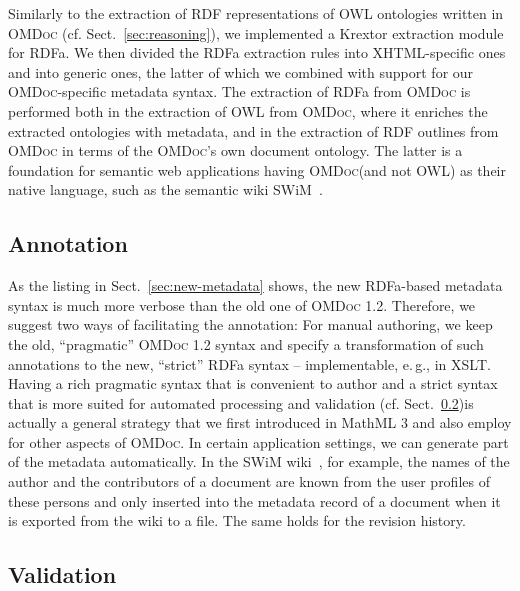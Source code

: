 \documentclass{llncs}
\renewcommand{\omdoc}{\textsc{OMDoc}\xspace}
\begin{document}
Similarly to the extraction of RDF representations of OWL ontologies written in \omdoc
(cf. Sect.~\ref{sec:reasoning}), we implemented a Krextor extraction module for RDFa.
We then divided the RDFa extraction rules into XHTML-specific ones and into generic ones,
the latter of which we combined with support for our \omdoc-specific metadata syntax.  The
extraction of RDFa from \omdoc is performed both in the extraction of OWL from \omdoc,
where it enriches the extracted ontologies with metadata, and in the extraction of RDF
outlines from \omdoc in terms of the \omdoc's own document ontology.  The latter is a
foundation for semantic web applications having \omdoc (and not OWL) as their native
language, such as the semantic wiki SWiM~\cite{lange:swim-demo08}.

\subsection{Annotation}\label{sec:annotation}

As the listing in Sect.~\ref{sec:new-metadata} shows, the new RDFa-based metadata syntax
is much more verbose than the old one of {\omdoc} 1.2.  Therefore, we suggest two ways of
facilitating the annotation: For manual authoring, we keep the old, ``pragmatic'' {\omdoc}
1.2 syntax and specify a transformation of such annotations to the new, ``strict'' RDFa
syntax -- implementable, e.\,g., in XSLT.  Having a rich pragmatic syntax that is
convenient to author and a strict syntax that is more suited for automated processing and
validation \ifpublic\else (cf. Sect.~\ref{sec:validation})\fi is actually a general
strategy that we first introduced in MathML 3 and also employ for other aspects of
{\omdoc}.  In certain application settings, we can generate part of the metadata
automatically.  In the SWiM wiki~\cite{lange:swim-demo08}, for example, the names of the
author and the contributors of a document are known from the user profiles of these
persons and only inserted into the metadata record of a document when it is exported from
the wiki to a file.  The same holds for the revision history.

\ifpublic\else
\subsection{Validation}\label{sec:validation}
\end{document}

